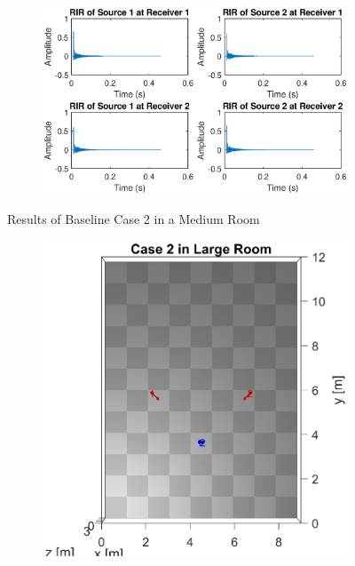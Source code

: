 \documentclass[a4paper,twoside,12pt,hidelinks]{article}
\begin{document}
\begin{appendices}
\begin{figure}[H]
\begin{subfigure}[H]{0.6\textwidth}
\includegraphics[width=\textwidth]{2m_ir}
\end{subfigure}
\caption{Results of Baseline Case 2 in a Medium Room}
\end{figure}
\begin{figure}[H]
\centering
\begin{subfigure}[H]{0.35\textwidth}
\includegraphics[width=\textwidth]{2l_lo}
\end{subfigure}
\begin{subfigure}[H]{0.6\textwidth}

\end{subfigure}
\end{figure}
\end{appendices}
\end{document}

